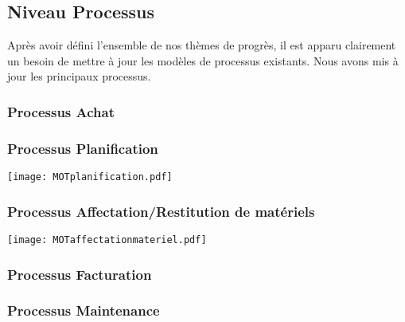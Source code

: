         \subsection{Niveau Processus}
        Après avoir défini l'ensemble de nos thèmes de progrès, il est apparu clairement un besoin de mettre à jour les modèles de processus existants. Nous avons mis à jour les principaux processus.\\

                \subsubsection{Processus Achat}


                \subsubsection{Processus Planification}
                    
                    \texttt{[image: MOTplanification.pdf]}
                
                \subsubsection{Processus Affectation/Restitution de matériels}

                    \texttt{[image: MOTaffectationmateriel.pdf]}

                \subsubsection{Processus Facturation}




                \subsubsection{Processus Maintenance}



